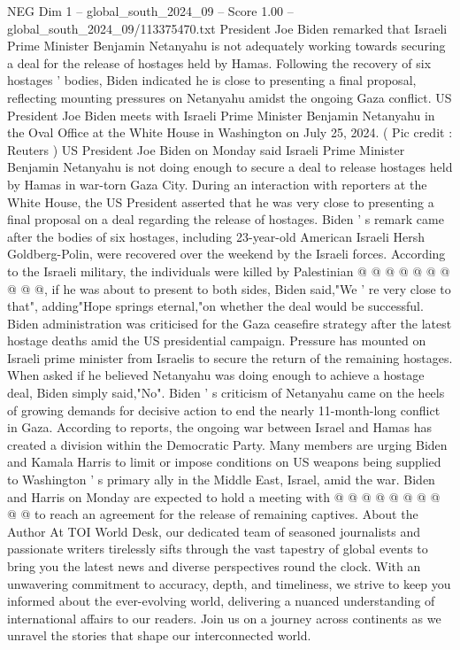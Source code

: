 \begin{textsample}{NEG Dim 1 – global\_south\_2024\_09 – Score 1.00 – global\_south\_2024\_09/113375470.txt}  \label{ex:f1_neg_422}
President Joe Biden remarked that Israeli Prime Minister Benjamin Netanyahu is not adequately working towards securing a deal for the release of hostages held by Hamas.
Following the recovery of six hostages ' bodies, Biden indicated he is close to presenting a final proposal, reflecting mounting pressures on Netanyahu amidst the ongoing Gaza conflict.
US President Joe Biden meets with Israeli Prime Minister Benjamin Netanyahu in the Oval Office at the White House in Washington on July 25, 2024. ( Pic credit : Reuters ) US President Joe Biden on Monday said Israeli Prime Minister Benjamin Netanyahu is not doing enough to secure a deal to release hostages held by Hamas in war-torn Gaza City.
During an interaction with reporters at the White House, the US President asserted that he was very close to presenting a final proposal on a deal regarding the release of hostages.
Biden ' s remark came after the bodies of six hostages, including 23-year-old American Israeli Hersh Goldberg-Polin, were recovered over the weekend by the Israeli forces.
According to the Israeli military, the individuals were killed by Palestinian @ @ @ @ @ @ @ @ @ @, if he was about to present to both sides, Biden said,"We ' re very close to that", adding"Hope springs eternal,"on whether the deal would be successful.
Biden administration was criticised for the Gaza ceasefire strategy after the latest hostage deaths amid the US presidential campaign.
Pressure has mounted on Israeli prime minister from Israelis to secure the return of the remaining hostages.
When asked if he believed Netanyahu was doing enough to achieve a hostage deal, Biden simply said,"No".
Biden ' s criticism of Netanyahu came on the heels of growing demands for decisive action to end the nearly 11-month-long conflict in Gaza.
According to reports, the ongoing war between Israel and Hamas has created a division within the Democratic Party.
Many members are urging Biden and Kamala Harris to limit or impose conditions on US weapons being supplied to Washington ' s primary ally in the Middle East, Israel, amid the war.
Biden and Harris on Monday are expected to hold a meeting with @ @ @ @ @ @ @ @ @ @ to reach an agreement for the release of remaining captives.
About the Author At TOI World Desk, our dedicated team of seasoned journalists and passionate writers tirelessly sifts through the vast tapestry of global events to bring you the latest news and diverse perspectives round the clock.
With an unwavering commitment to accuracy, depth, and timeliness, we strive to keep you informed about the ever-evolving world, delivering a nuanced understanding of international affairs to our readers.
Join us on a journey across continents as we unravel the stories that shape our interconnected world.

\end{textsample}
